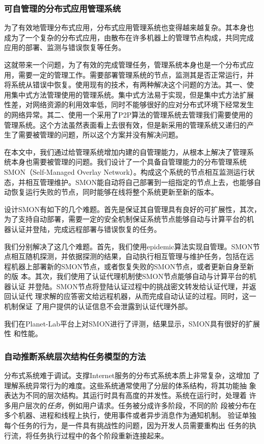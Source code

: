 \subsubsection*{可自管理的分布式应用管理系统}

为了有效地管理分布式应用，分布式应用管理系统也变得越来越复杂。其本身也
成为了一个复杂的分布式应用，由散布在许多机器上的管理节点构成，共同完成
应用的部署、监测与错误恢复等任务。

这就带来一个问题，为了有效的完成管理任务，管理系统本身也是一个分布式应
用，需要一定的管理工作。需要部署管理系统的节点，监测其是否正常运行，并
将系统从错误中恢复。使用现有的技术，有两种解决这个问题的方法。其一、使
用集中式方法管理使用的管理系统。集中式方法易于实现，但是集中式方法扩展
性差，对网络资源的利用效率低，同时不能够很好的应对分布式环境下经常发生
的网络异常。其二、使用一个采用了P2P算法的管理系统去管理我们需要使用的
管理系统。这个方法虽然表面看上去很有效，但是新采用的管理系统又递归的产
生了需要被管理的问题，所以这个方案并没有解决问题。

在本文中，我们通过给管理系统增加内建的自管理能力，从根本上解决了管理系
统本身也需要被管理的问题。我们设计了一个具备自管理能力的分布管理系统
SMON（Self-Managed Overlay Network）。构成这个系统的节点相互监测运行状
态，并相互管理维护。SMON能自动将自己部署到一组指定的节点上去，也能够自
动恢复运行失败的节点，同时能够在线将整个系统更新至新的版本。

设计SMON有如下的几个难题。首先是保证其自管理具有良好的可扩展性，其次，
为了支持自动部署，需要一定的安全机制保证系统节点能够自动与计算平台的机
器认证并登陆，完成远程部署与错误恢复的任务。

我们分别解决了这几个难题。首先，我们使用epidemic算法实现自管理。SMON节
点相互随机探测，并依据探测的结果，自动执行相互管理与维护任务，包括在远
程机器上部署新的SMON节点，或者恢复失败的SMON节点，或者更新自身至新的版
本。其次，我们使用了认证代理机制使SMON节点能够自动与计算平台的机器认证
并登陆。SMON节点将登陆认证过程中的挑战密文转发给认证代理，并返回认证代
理求解的应答密文给远程机器，从而完成自动认证的过程。同时，这一机制保证
了用户提供的认证信息不会泄露到认证代理外部。

我们在Planet-Lab平台上对SMON进行了评测，结果显示，SMON具有很好的扩展性
和性能。

\subsubsection*{自动推断系统层次结构任务模型的方法}

分布式系统难于调试。支撑Internet服务的分布式系统本质上非常复杂，这增加
了理解系统异常行为的难度。这些系统通常使用了分层的体系结构，将其功能抽
象表达为不同的层次结构。其运行时具有高度的并发性。系统在运行时，处理着
许多用户层次的\emph{任务}，例如用户请求。任务被分成许多阶段，不同的阶
段被分布在多个机器、进程和线程上执行，使用事件或者异步消息作为通知机制。
验证单独每个任务的行为，是一件具有挑战性的问题，因为开发人员需要重构出
任务的执行流，将任务执行过程中的各个阶段重新连接起来。

